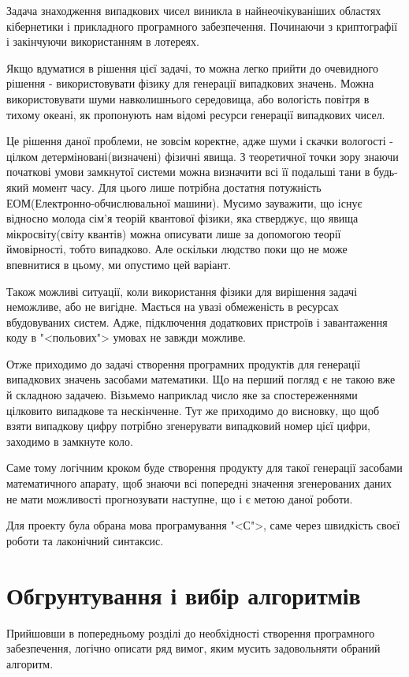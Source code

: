\documentclass[oneside,final,14pt]{extreport}
\begin{document}
\begin{large}
Задача знаходження випадкових чисел виникла в найнеочікуваніших областях 
кібернетики і прикладного програмного забезпечення. Починаючи з криптографії 
і закінчуючи використанням в лотереях.

Якщо вдуматися в рішення цієї задачі, то можна легко прийти до очевидного 
рішення - використовувати фізику для генерації випадкових значень. Можна 
використовувати шуми навколишнього середовища, або вологість повітря в тихому 
океані, як пропонують нам відомі ресурси генерації випадкових чисел.

Це рішення даної проблеми, не зовсім коректне, адже шуми і скачки вологості - 
цілком детерміновані(визначені) фізичні явища. З теоретичної точки зору 
знаючи початкові умови замкнутої системи можна визначити всі її подальші 
тани в будь-який момент часу. Для цього лише потрібна достатня потужність 
ЕОМ(Електронно-обчислювальної машини). Мусимо зауважити, що існує відносно 
молода сім'я теорій квантової фізики, яка стверджує, що явища 
мікросвіту(світу квантів) можна описувати лише за допомогою теорії ймовірності, 
тобто випадково. Але оскільки людство поки що не може впевнитися в цьому,
 ми опустимо цей варіант. 

Також можливі ситуації, коли використання фізики для вирішення задачі 
неможливе, або не вигідне. Мається на увазі обмеженість в ресурсах 
вбудовуваних систем. Адже, підключення додаткових пристроїв і завантаження 
коду в "<польових"> умовах не завжди можливе.

Отже приходимо до задачі створення програмних продуктів для генерації 
випадкових значень засобами математики. Що на перший погляд є не такою 
вже й складною задачею. Візьмемо наприклад число  яке за спостереженнями 
цілковито випадкове та нескінченне. Тут же приходимо до висновку, що щоб 
взяти випадкову цифру потрібно згенерувати випадковий номер цієї цифри, 
заходимо в замкнуте коло. 

Саме тому логічним кроком буде створення продукту для такої генерації 
засобами математичного апарату, щоб знаючи всі попередні значення 
згенерованих даних не мати можливості прогнозувати наступне, що і є 
метою даної роботи.

Для проекту була обрана мова програмування "<С">, саме через швидкість 
своєї роботи та лаконічний синтаксис.

\chapter{Обгрунтування і вибір алгоритмів}\label{c:2}
Прийшовши в попередньому розділі до необхідності створення програмного 
забезпечення, логічно описати ряд вимог, яким мусить задовольняти 
обраний алгоритм.


\end{large}
\end{document}
